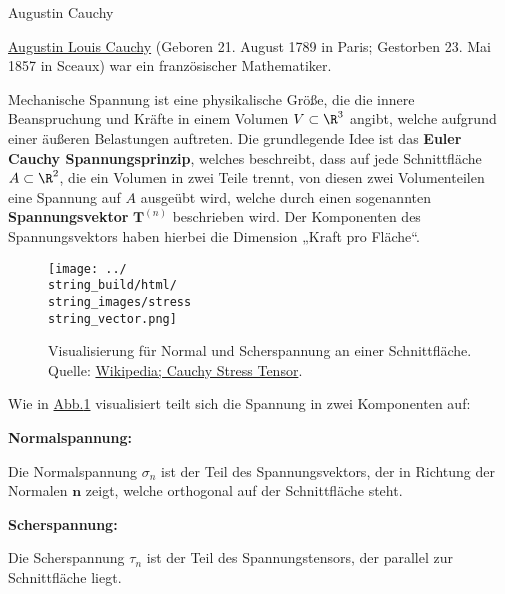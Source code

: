 \documentclass[letterpaper,10pt,german]{jupyterBook}
\begin{document}
\begin{emphBox}{Augustin Cauchy}{}

\par
\href{https://de.wikipedia.org/wiki/Augustin-Louis\_Cauchy}{Augustin Louis Cauchy} (Geboren 21. August 1789 in Paris; Gestorben 23. Mai 1857 in Sceaux) war ein französischer Mathematiker.
\end{emphBox}

\par
Mechanische Spannung ist eine physikalische Größe, die die innere Beanspruchung und Kräfte in einem Volumen \(V\subset\R^3\) angibt, welche aufgrund einer äußeren Belastungen auftreten.
Die grundlegende Idee ist das \textbf{Euler Cauchy Spannungsprinzip}, welches beschreibt, dass auf jede Schnittfläche \(A\subset\R^2\), die ein Volumen in zwei Teile trennt, von diesen zwei Volumenteilen eine Spannung auf \(A\) ausgeübt wird, welche durch einen sogenannten \textbf{Spannungsvektor} \(\mathbf{T}^{(n)}\) beschrieben wird.
Der Komponenten des Spannungsvektors haben hierbei die Dimension „Kraft pro Fläche“.

\begin{figure}[htbp]
\centering


\noindent\texttt{[image: ../\\string\_build/html/\\string\_images/stress\\string\_vector.png]}
\caption{Visualisierung für Normal  und Scherspannung an einer Schnittfläche. Quelle: \href{https://en.wikipedia.org/wiki/Cauchy\_stress\_tensor}{Wikipedia; Cauchy Stress Tensor}.}\label{\detokenize{vektoranalysis/tensor:fig-stress}}\end{figure}

\par
Wie in \hyperref[\detokenize{vektoranalysis/tensor:fig-stress}]{Abb.\@ \ref{\detokenize{vektoranalysis/tensor:fig-stress}}} visualisiert teilt sich die Spannung in zwei Komponenten auf:

\par
\textbf{Normalspannung:}

\par
Die Normalspannung \(\sigma_n\) ist der Teil des Spannungsvektors, der in Richtung der Normalen \(\mathbf{n}\) zeigt, welche orthogonal auf der Schnittfläche steht.

\par
\textbf{Scherspannung:}

\par
Die Scherspannung \(\tau_n\) ist der Teil des Spannungstensors, der parallel zur Schnittfläche liegt.
\end{document}
